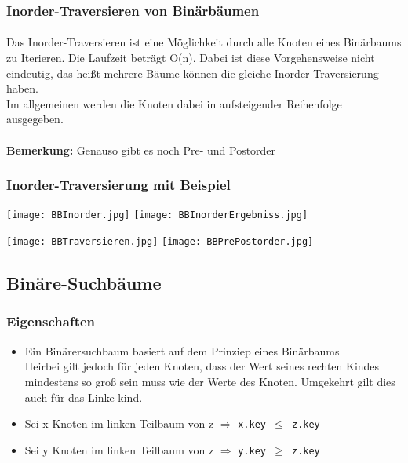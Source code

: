 		\vspace{1cm}

		\begin{minipage}[t]{0.5\textwidth}
			\subsubsection{Inorder-Traversieren von Binärbäumen}
				\paragraph{} Das Inorder-Traversieren ist eine Möglichkeit durch alle Knoten eines Binärbaums 
				zu Iterieren. Die Laufzeit beträgt O(n). Dabei ist diese Vorgehensweise nicht eindeutig, das hei\ss t
				mehrere Bäume können die gleiche Inorder-Traversierung haben. \\
				Im allgemeinen werden die Knoten dabei in aufsteigender Reihenfolge ausgegeben. \\ \\ 

				\textbf{Bemerkung:} Genauso gibt es noch Pre- und Postorder
		\end{minipage}
		\begin{minipage}[t]{0.45\textwidth}
			\begin{center}
			\subsubsection{Inorder-Traversierung mit Beispiel}
				\texttt{[image: BBInorder.jpg]}
				\texttt{[image: BBInorderErgebniss.jpg]}
			\end{center}
		\end{minipage}

		\begin{center}
			\texttt{[image: BBTraversieren.jpg]}
			\texttt{[image: BBPrePostorder.jpg]}
		\end{center}

	
	\newpage
	\subsection{Binäre-Suchbäume}
		\subsubsection{Eigenschaften}
			\begin{itemize}
				\item Ein Binärersuchbaum basiert auf dem Prinziep eines Binärbaums \\
					Heirbei gilt jedoch für jeden Knoten, dass der Wert seines rechten Kindes 
					mindestens so groß sein muss wie der Werte des Knoten. Umgekehrt gilt dies auch 
					für das Linke kind.
				\item Sei x Knoten im linken Teilbaum von z $\Rightarrow$ \texttt{x.key $\leq$ z.key}
				\item Sei y Knoten im linken Teilbaum von z $\Rightarrow$ \texttt{y.key $\geq$ z.key}
			\end{itemize}


